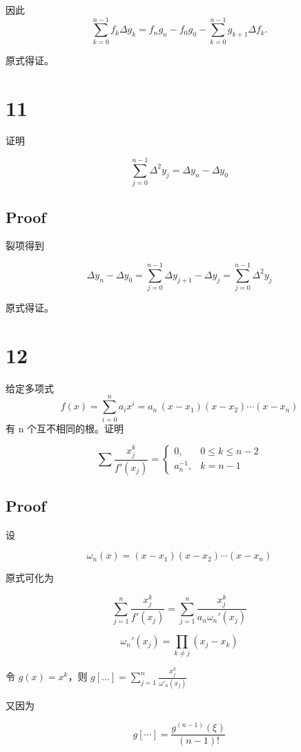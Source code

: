 \documentclass[11pt]{article}
\begin{document}
因此 \[
   \boxed{
   \sum_{k=0}^{n-1}f_k\Delta g_k = f_n g_n - f_0 g_0 - \sum_{k=0}^{n-1} g_{k+1}\Delta f_k.}
   \]

原式得证。

    \section{11}\label{section}

证明

\[
\sum_{j = 0}^{n - 1} \Delta^2 y_j = \Delta y_n - \Delta y_0
\]

\subsection{Proof}\label{proof}

裂项得到

\[
\Delta y_n - \Delta y_0 = \sum_{j = 0}^{n - 1}\Delta y_{j + 1} - \Delta y_j = \sum_{j = 0}^{n - 1}\Delta^2y_j
\]

原式得证。

    \section{12}\label{section}

给定多项式 \[
f(x)=\sum_{i=0}^n a_i x^i = a_n\,(x-x_1)(x-x_2)\cdots (x-x_n)
\] 有 n 个互不相同的根。证明

\[
\sum \frac{x_j^k}{f'(x_j)} = 
\begin{cases}
0, & 0≤k≤n-2 \\
a_n^{-1}, & k=n-1
\end{cases}
\]

\subsection{Proof}\label{proof}

设

\[
\omega_n (x) = (x - x_1)(x - x_2)\cdots(x - x_n)
\]

原式可化为

\[
\sum_{j = 1}^n\frac{x_j^k}{f'(x_j)} = \sum_{j = 1}^n\frac{x_j^k}{a_n\omega_n'(x_j)}
\]

\[
\omega_n'(x_j)=\prod_{k\neq j}(x_j - x_k)
\]

令 \(g(x) = x^k\)，则
\(g[\dots]=\sum_{j=1}^n\frac{x_j^k}{\omega'_n(x_j)}\)

又因为

\[
g[\cdots]=\frac{g^{(n-1)}(\xi)}{(n-1)!}
\]
\end{document}
